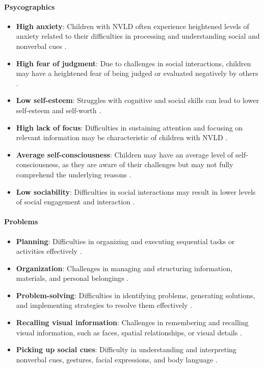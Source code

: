 \paragraph{Psycographics}
\begin{itemize}
    \item \textbf{High anxiety}: Children with NVLD often experience heightened levels of anxiety related to their difficulties in processing and understanding social and nonverbal cues \cite{understood_nvld_2024}.
    \item \textbf{High fear of judgment}: Due to challenges in social interactions, children may have a heightened fear of being judged or evaluated negatively by others \cite{understood_nvld_adult_2024}.
    \item \textbf{Low self-esteem}: Struggles with cognitive and social skills can lead to lower self-esteem and self-worth \cite{jama_nvld_2024}.
    \item \textbf{High lack of focus}: Difficulties in sustaining attention and focusing on relevant information may be characteristic of children with NVLD \cite{understood_nvld_2024}.
    \item \textbf{Average self-consciousness}: Children may have an average level of self-consciousness, as they are aware of their challenges but may not fully comprehend the underlying reasons \cite{understood_nvld_2024}.
    \item \textbf{Low sociability}: Difficulties in social interactions may result in lower levels of social engagement and interaction \cite{understood_nvld_2024}.
\end{itemize}

\paragraph{Problems}
\begin{itemize}
    \item \textbf{Planning}: Difficulties in organizing and executing sequential tasks or activities effectively \cite{understood_nvld_adult_2024}.
    \item \textbf{Organization}: Challenges in managing and structuring information, materials, and personal belongings \cite{understood_nvld_adult_2024}.
    \item \textbf{Problem-solving}: Difficulties in identifying problems, generating solutions, and implementing strategies to resolve them effectively \cite{understood_nvld_2024}.
    \item \textbf{Recalling visual information}: Challenges in remembering and recalling visual information, such as faces, spatial relationships, or visual details \cite{understood_nvld_2024}.
    \item \textbf{Picking up social cues}: Difficulty in understanding and interpreting nonverbal cues, gestures, facial expressions, and body language \cite{understood_nvld_2024}.
\end{itemize}

